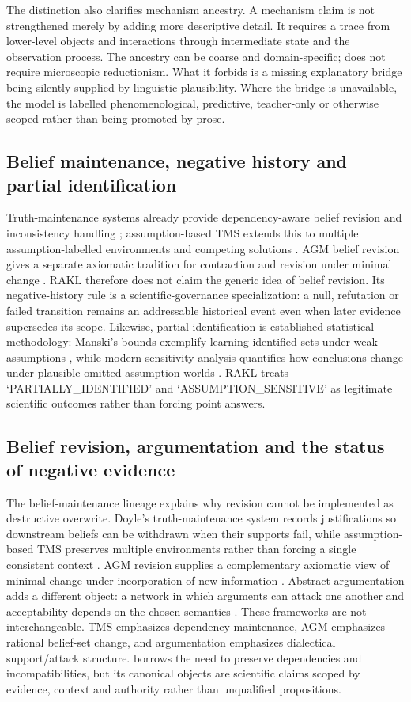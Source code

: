 The distinction also clarifies mechanism ancestry. A mechanism claim is not strengthened merely by adding more descriptive detail. It requires a trace from lower-level objects and interactions through intermediate state and the observation process. The ancestry can be coarse and domain-specific; \RAKL{} does not require microscopic reductionism. What it forbids is a missing explanatory bridge being silently supplied by linguistic plausibility. Where the bridge is unavailable, the model is labelled phenomenological, predictive, teacher-only or otherwise scoped rather than being promoted by prose.

\subsection{Belief maintenance, negative history and partial identification}
Truth-maintenance systems already provide dependency-aware belief revision and inconsistency handling \cite{doyle1979}; assumption-based TMS extends this to multiple assumption-labelled environments and competing solutions \cite{dekleer1986}. AGM belief revision gives a separate axiomatic tradition for contraction and revision under minimal change \cite{agm1985}. RAKL therefore does not claim the generic idea of belief revision. Its negative-history rule is a scientific-governance specialization: a null, refutation or failed transition remains an addressable historical event even when later evidence supersedes its scope. Likewise, partial identification is established statistical methodology: Manski's bounds exemplify learning identified sets under weak assumptions \cite{manski1990}, while modern sensitivity analysis quantifies how conclusions change under plausible omitted-assumption worlds \cite{cinelli2020}. RAKL treats `PARTIALLY\_IDENTIFIED' and `ASSUMPTION\_SENSITIVE' as legitimate scientific outcomes rather than forcing point answers.

\subsection{Belief revision, argumentation and the status of negative evidence}

The belief-maintenance lineage explains why revision cannot be implemented as destructive overwrite. Doyle's truth-maintenance system records justifications so downstream beliefs can be withdrawn when their supports fail, while assumption-based TMS preserves multiple environments rather than forcing a single consistent context \cite{doyle1979,dekleer1986}. AGM revision supplies a complementary axiomatic view of minimal change under incorporation of new information \cite{agm1985}. Abstract argumentation adds a different object: a network in which arguments can attack one another and acceptability depends on the chosen semantics \cite{dung1995}. These frameworks are not interchangeable. TMS emphasizes dependency maintenance, AGM emphasizes rational belief-set change, and argumentation emphasizes dialectical support/attack structure. \RAKL{} borrows the need to preserve dependencies and incompatibilities, but its canonical objects are scientific claims scoped by evidence, context and authority rather than unqualified propositions.

